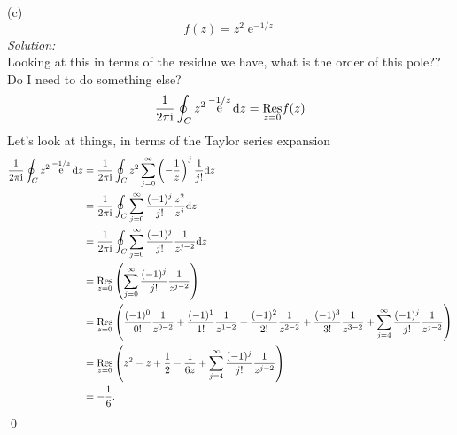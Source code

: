 \documentclass[10pt]{amsart}
\newcommand{\D}{\mathrm{d}}
\newcommand{\I}{\mathrm{i}}
\DeclareMathOperator{\E}{e}
\theoremstyle{nonumberplain}
\begin{document}
\begin{enumerate}[label={\bf {\arabic*}:}]
\noindent
(c)
$$
f(z) = z^2\E^{-1/z}
$$
\textit{Solution:} \\
Looking at this in terms of the residue we have, what is the order of this pole?? Do I need to do something else?
\begin{align*}
\frac 1 {2 \pi \I} \oint_C z^2\E^{-1/z} \D z
	&= \underset{z=0}{\rm Res} f(z) \\
\end{align*}
Let's look at things, in terms of the Taylor series expansion
\begin{align*}
\frac 1 {2 \pi \I} \oint_C z^2\E^{-1/z} \D z 
	&= \frac 1 {2 \pi \I} \oint_C z^2 \sum_{j=0}^\infty \left(- \frac 1 z \right)^j \frac 1 {j!} \D z \\
	&= \frac 1 {2 \pi \I} \oint_C \sum_{j=0}^\infty \frac {(-1)^j}{j!} \frac {z^2} {z^j} \D z \\
	&= \frac 1 {2 \pi \I} \oint_C \sum_{j=0}^\infty \frac {(-1)^j}{j!} \frac 1 {z^{j - 2}} \D z \\
	&= \underset{z=0}{\rm Res} \left( \sum_{j=0}^\infty \frac {(-1)^j}{j!} \frac 1 {z^{j - 2}} \right) \\
	&= \underset{z=0}{\rm Res} \left(
		\frac {(-1)^0}{0!} \frac 1 {z^{0 - 2}} 
		+ \frac {(-1)^1}{1!} \frac 1 {z^{1 - 2}} 
		+ \frac {(-1)^2}{2!} \frac 1 {z^{2 - 2}} 
		+ \frac {(-1)^3}{3!} \frac 1 {z^{3 - 2}} 
		+ \sum_{j=4}^\infty \frac {(-1)^j}{j!} \frac 1 {z^{j - 2}}
	\right) \\
	&= \underset{z=0}{\rm Res} \left(
		z^2 - z + \frac 1 2
		- \frac 1 {6z}
		+ \sum_{j=4}^\infty \frac {(-1)^j}{j!} \frac 1 {z^{j - 2}}
	\right) \\
	&= - \frac 1 6.
\end{align*}
\qed \\

\newpage



\end{enumerate}
\end{document}
